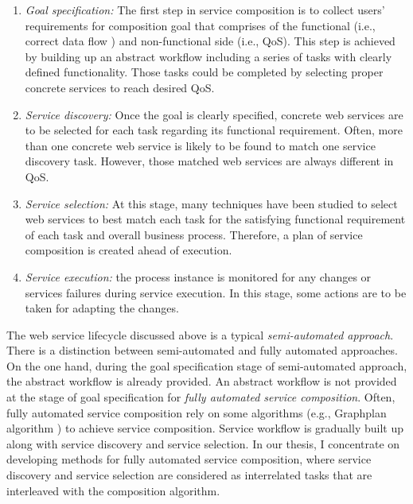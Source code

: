 \begin{enumerate}
 \item \textit{Goal specification:} The first step in service composition is to collect users' requirements for composition goal that comprises of the functional (i.e., correct data flow ) and non-functional side (i.e., QoS). This step is achieved by building up an abstract workflow including a series of tasks with clearly defined functionality. Those tasks could be completed by selecting proper concrete services to reach desired QoS. 
 \item \textit{Service discovery:} Once the goal is clearly specified, concrete web services are to be selected for each task regarding its functional requirement. Often, more than one concrete web service is likely to be found to match one service discovery task. However, those matched web services are always different in QoS.
 \item \textit{Service selection:} At this stage, many techniques have been studied to select web services to best match each task for the satisfying functional requirement of each task and overall business process. Therefore, a plan of service composition is created ahead of execution.
 \item \textit{Service execution:} the process instance is monitored for any changes or services failures during service execution. In this stage, some actions are to be taken for adapting the changes.
\end{enumerate}
The web service lifecycle discussed above is a typical \emph{semi-automated approach}. There is a distinction between semi-automated and fully automated approaches. On the one hand, during the goal specification stage of semi-automated approach, the abstract workflow is already provided. An abstract workflow is not provided at the stage of goal specification for \emph{fully automated service composition}. Often, fully automated service composition rely on some algorithms (e.g., Graphplan algorithm \cite{blum1997fast}) to achieve service composition. Service workflow is gradually built up along with service discovery and service selection. In our thesis, I concentrate on developing methods for fully automated service composition, where service discovery and service selection are considered as interrelated tasks that are interleaved with the composition algorithm. 

